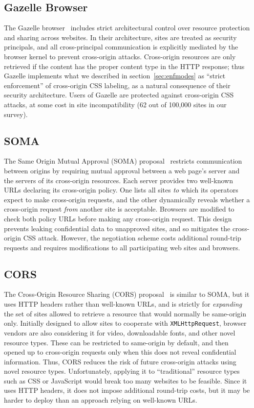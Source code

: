 \documentclass{acm_proc_article-sp}
\begin{document}
\subsection{Gazelle Browser}
The Gazelle browser~\cite{gazelle} includes strict architectural
control over resource protection and sharing across websites.  In
their architecture, sites are treated as security principals, and all
cross-principal communication is explicitly mediated by the browser
kernel to prevent cross-origin attacks.  Cross-origin resources are
only retrieved if the content has the proper content type in the HTTP
response; thus Gazelle implements what we described in
section~\ref{sec:enfmodes} as “strict enforcement” of cross-origin CSS
labeling, as a natural consequence of their security architecture.
Users of Gazelle are protected against cross-origin CSS attacks, at
some cost in site incompatibility (62 out of 100,000 sites in our
survey).

\subsection{SOMA}
The Same Origin Mutual Approval (SOMA) proposal~\cite{soma} restricts
communication between origins by requiring mutual approval between a
web page's server and the servers of its cross-origin resources.  Each
server provides two well-known URLs declaring its cross-origin policy.
One lists all sites \emph{to} which its operators expect to make
cross-origin requests, and the other dynamically reveals whether a
cross-origin request \emph{from} another site is acceptable.  Browsers
are modified to check both policy URLs before making any cross-origin
request.  This design prevents leaking confidential data to unapproved
sites, and so mitigates the cross-origin CSS attack. However, the
negotiation scheme costs additional round-trip requests and requires
modifications to all participating web sites and browsers.

\subsection{CORS}
The Cross-Origin Resource Sharing (CORS) proposal~\cite{cors} is
similar to SOMA, but it uses HTTP headers rather than well-known URLs,
and is strictly for \emph{expanding} the set of sites allowed to
retrieve a resource that would normally be same-origin only.
Initially designed to allow sites to cooperate with
\texttt{XMLHttpRequest}, browser vendors are also considering it for
video, downloadable fonts, and other novel resource types.  These can
be restricted to same-origin by default, and then opened up to
cross-origin requests only when this does not reveal confidential
information.  Thus, CORS reduces the risk of future cross-origin
attacks using novel resource types.  Unfortunately, applying it to
“traditional” resource types such as CSS or JavaScript would break too
many websites to be feasible.  Since it uses HTTP headers, it does not
impose additional round-trip costs, but it may be harder to deploy
than an approach relying on well-known URLs.
\end{document}
